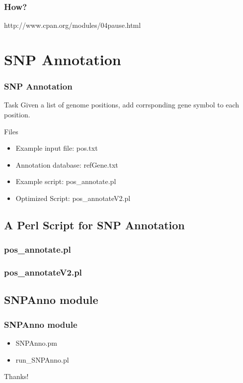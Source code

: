 \documentclass[UTF8]{beamer}
\begin{document}
\begin{frame}
  \frametitle{How?}
  http://www.cpan.org/modules/04pause.html
\end{frame}

\section{SNP Annotation}

\begin{frame}
  \frametitle{SNP Annotation}
  \begin{block}{Task}
    Given a list of genome positions, add corrsponding gene symbol to each
    position.
  \end{block}
  \begin{block}{Files}
    \begin{itemize}
      \item Example input file: pos.txt
      \item Annotation database: refGene.txt
      \item Example script: pos_annotate.pl
      \item Optimized Script: pos_annotateV2.pl
    \end{itemize}
  \end{block}
\end{frame}

\subsection{A Perl Script for SNP Annotation}
\begin{frame}
  \frametitle{pos_annotate.pl}
\end{frame}

\begin{frame}
  \frametitle{pos_annotateV2.pl}
\end{frame}

\subsection{SNPAnno module}

\begin{frame}
  \frametitle{SNPAnno module}
  \begin{itemize}
    \item SNPAnno.pm
    \item run_SNPAnno.pl
  \end{itemize}
\end{frame}


\begin{frame}
  \centerline{\huge{Thanks!}}
\end{frame}
\end{document}
